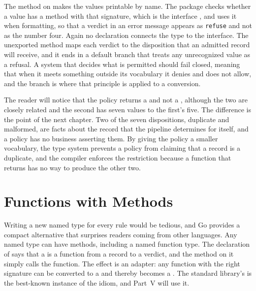The method  on  makes the values printable by name. The  package checks whether a value has a method with that signature, which is the interface , and uses it when formatting, so that a verdict in an error message appears as \texttt{refuse} and not as the number four. Again no declaration connects the type to the interface. The unexported method  maps each verdict to the disposition that an admitted record will receive, and it ends in a default branch that treats any unrecognized value as a refusal. A system that decides what is permitted should fail closed, meaning that when it meets something outside its vocabulary it denies and does not allow, and the branch is where that principle is applied to a conversion.

The reader will notice that the policy returns a  and not a , although the two are closely related and the second has seven values to the first's five. The difference is the point of the next chapter. Two of the seven dispositions, duplicate and malformed, are facts about the record that the pipeline determines for itself, and a policy has no business asserting them. By giving the policy a smaller vocabulary, the type system prevents a policy from claiming that a record is a duplicate, and the compiler enforces the restriction because a function that returns  has no way to produce the other two.

\section{Functions with Methods}

Writing a new named type for every rule would be tedious, and Go provides a compact alternative that surprises readers coming from other languages. Any named type can have methods, including a named function type. The declaration of  says that a  is a function from a record to a verdict, and the method  on it simply calls the function. The effect is an adapter: any function with the right signature can be converted to a  and thereby becomes a . The standard library's  is the best-known instance of the idiom, and Part~V will use it.

